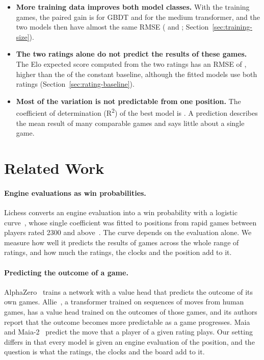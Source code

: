 \documentclass[11pt]{article}
\begin{document}
\begin{itemize}
whose encoder is initialised from a model trained on engine evaluations is
significantly worse than the same transformer trained from random
initialisation, with and without the hand-crafted features
(Section~\ref{sec:ablations}).
\fi
\ifmore
\item \textbf{More training data improves both model classes.} With
 the training games, the paired gain is
 for GBDT and
 for
the medium transformer, and the two models then have almost the same RMSE
( and
;
Section~\ref{sec:training-size}).
\fi
\item \textbf{The two ratings alone do not predict the results of these
games.} The Elo expected score computed from the two ratings has an RMSE of
, higher than the  of the constant
baseline, although the fitted models use both ratings
(Section~\ref{sec:rating-baseline}).
\item \textbf{Most of the variation is not predictable from one position.}
The coefficient of determination (R\textsuperscript{2}) of the best model is
. A prediction describes the mean result of many comparable games
and says little about a single game.
\end{itemize}

\section{Related Work}
\label{sec:related}

\paragraph{Engine evaluations as win probabilities.}
Lichess converts an engine evaluation into a win probability with a logistic
curve~\cite{lichessaccuracy}, whose single coefficient was fitted to
positions from rapid games between players rated 2300 and
above~\cite{lilawinchances}. The curve depends on the evaluation alone. We
measure how well it predicts the results of games across the whole range of
ratings, and how much the ratings, the clocks and the position add to it.

\paragraph{Predicting the outcome of a game.}
AlphaZero~\cite{alphazero} trains a network with a value head that predicts
the outcome of its own games. Allie~\cite{allie}, a transformer trained on
sequences of moves from human games, has a value head trained on the outcomes
of those games, and its authors report that the outcome becomes more
predictable as a game progresses. Maia~\cite{maia} and Maia-2~\cite{maia2}
predict the move that a player of a given rating plays. Our setting differs
in that every model is given an engine evaluation of the position, and the
question is what the ratings, the clocks and the board add to it.
\end{document}
